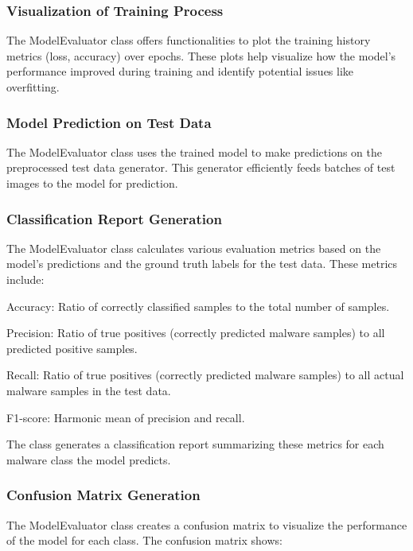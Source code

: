 \documentclass[conference]{IEEEtran}
\begin{document}
\subsubsection{Visualization of Training Process}

    The ModelEvaluator class  offers functionalities to plot the training history metrics (loss, accuracy) over epochs. These plots help visualize how the model's performance improved during training and identify potential issues like overfitting.

\subsubsection{Model Prediction on Test Data}

    The ModelEvaluator class uses the trained model to make predictions on the preprocessed test data generator. This generator efficiently feeds batches of test images to the model for prediction.

\subsubsection{Classification Report Generation}

    The ModelEvaluator class  calculates various evaluation metrics based on the model's predictions and the ground truth labels for the test data. These metrics include:
        
        Accuracy: Ratio of correctly classified samples to the total number of samples.
        
        Precision: Ratio of true positives (correctly predicted malware samples) to all predicted positive samples.
        
        Recall: Ratio of true positives (correctly predicted malware samples) to all actual malware samples in the test data.
        
        F1-score: Harmonic mean of precision and recall.
    
    The class  generates a classification report summarizing these metrics for each malware class the model predicts.

\subsubsection{Confusion Matrix Generation}

    The ModelEvaluator class creates a confusion matrix to visualize the performance of the model for each class. The confusion matrix shows:
        
\end{document}

